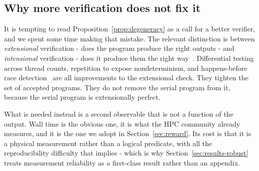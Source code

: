 \subsection{Why more verification does not fix it}

It is tempting to read Proposition~\ref{prop:degeneracy} as a call for a better
verifier, and we spent some time making that mistake. The relevant distinction
is between \emph{extensional} verification - does the program produce the right
outputs - and \emph{intensional} verification - does it produce them the right
way~\cite{gamingverifiers}. Differential testing across thread counts,
repetition to expose nondeterminism, and happens-before race
detection~\cite{archer,tsan} are all improvements to the extensional check.
They tighten the set of accepted programs. They do not remove the serial
program from it, because the serial program is extensionally perfect.

What is needed instead is a second observable that is not a function of the
output. Wall time is the obvious one, it is what the HPC community already
measures, and it is the one we adopt in Section~\ref{sec:reward}. Its cost is
that it is a physical measurement rather than a logical predicate, with all
the reproducibility difficulty that implies - which is why
Section~\ref{sec:results-robust} treats measurement reliability as a
first-class result rather than an appendix.
